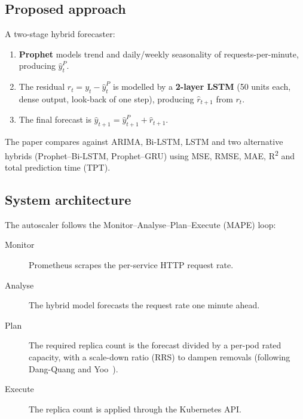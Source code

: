 \documentclass[11pt,a4paper]{article}
\begin{document}
\subsection{Proposed approach}
A two-stage hybrid forecaster:
\begin{enumerate}
\item \textbf{Prophet} models trend and daily/weekly seasonality of requests-per-minute, producing $\hat{y}^{P}_t$.
\item The residual $r_t = y_t - \hat{y}^{P}_t$ is modelled by a \textbf{2-layer LSTM} (50 units each, dense output, look-back of one step), producing $\hat{r}_{t+1}$ from $r_t$.
\item The final forecast is $\hat{y}_{t+1} = \hat{y}^{P}_{t+1} + \hat{r}_{t+1}$.
\end{enumerate}
The paper compares against ARIMA, Bi-LSTM, LSTM and two alternative hybrids (Prophet--Bi-LSTM, Prophet--GRU) using MSE, RMSE, MAE, R\textsuperscript{2} and total prediction time (TPT).

\subsection{System architecture}
The autoscaler follows the Monitor--Analyse--Plan--Execute (MAPE) loop:
\begin{description}
\item[Monitor] Prometheus scrapes the per-service HTTP request rate.
\item[Analyse] The hybrid model forecasts the request rate one minute ahead.
\item[Plan] The required replica count is the forecast divided by a per-pod rated capacity, with a scale-down ratio (RRS) to dampen removals (following Dang-Quang and Yoo~\cite{dangquang2021}).
\item[Execute] The replica count is applied through the Kubernetes API.
\end{description}
\end{document}
